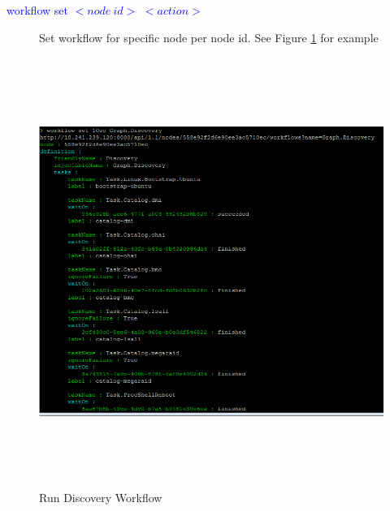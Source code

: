 \documentclass [12pt, a4paper, titlepage]{article}
\begin{document}
        \begin{description}
            \item[\textcolor{blue}{workflow set $<node\ id>$ $<action>$}] Set workflow for specific node per node id. See Figure \ref{workflows3} for example
        \end{description}
        \begin{figure}[H]
        \begin{center}
        \includegraphics[width=13cm,height=14cm]{png/workflows3.png}
        \end{center}
        \caption{Run Discovery Workflow}
        \label{workflows3}
        \end{figure}
\end{document}
